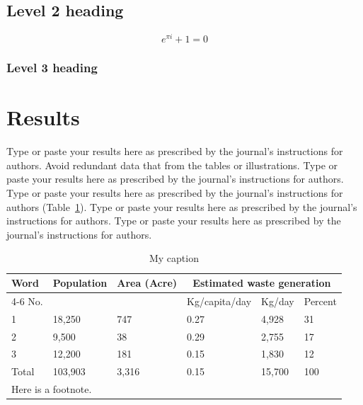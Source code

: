 \documentclass[12pt,a4paper]{article}
\begin{document}
\subsection*{Level 2 heading}

\begin{equation} 
\label{eu_eqn}
e^{\pi i} + 1 = 0
\end{equation}
\subsubsection*{Level 3 heading}


\section*{Results}
Type or paste your results here as prescribed by the journal’s instructions for authors. Avoid redundant data that from the tables or illustrations.  Type or paste your results here as prescribed by the journal’s instructions for authors. Type or paste your results here as prescribed by the journal’s instructions for authors (Table~\ref{tb-label1}). Type or paste your results here as prescribed by the journal’s instructions for authors. Type or paste your results here as prescribed by the journal’s instructions for authors.  
\captionsetup{justification=justified, singlelinecheck=off,labelfont=bf}
\begin{table}[ht]

    \centering
    \caption{My caption}
    \label{tb-label1}
    \begin{tabularx}{\linewidth}{l*{5}{X}}
    \hline
    Word & Population & Area (Acre) & \multicolumn{3}{c}{Estimated waste generation}\\
    \cline{4-6}
    No. & & & Kg/capita/day & Kg/day & Percent\\
   \hline
    
    1 & 18,250 & 747 & 0.27 & 4,928 & 31\\
    2 & 9,500 & 38 & 0.29 & 2,755 & 17\\
    3 & 12,200 & 181 & 0.15 & 1,830 & 12\\
    \hline
    Total & 103,903 & 3,316 & 0.15 & 15,700 & 100\\
    \hline
    \multicolumn{6}{l}{\footnotesize{Here is a footnote.}} \\
    \end{tabularx}
    
\end{table}
\end{document}
